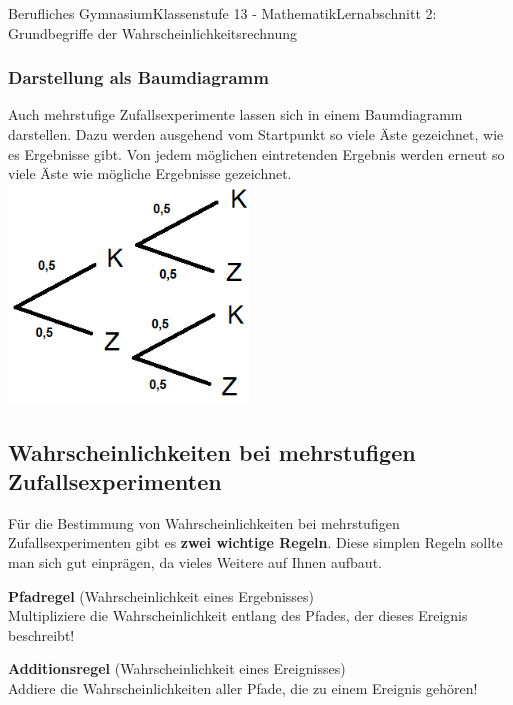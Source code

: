 \documentclass[11pt,twocolumn,oneside,openany,headings=optiontotoc,11pt,numbers=noenddot]{article}
\begin{document}
\begin{worksheet}{Berufliches Gymnasium}{Klassenstufe 13 - Mathematik}{Lernabschnitt 2: Grundbegriffe der Wahrscheinlichkeitsrechnung}
		\subsubsection{Darstellung als Baumdiagramm}
		Auch mehrstufige Zufallsexperimente lassen sich in einem Baumdiagramm darstellen. Dazu werden ausgehend vom Startpunkt so viele Äste gezeichnet, wie es Ergebnisse gibt. Von jedem möglichen eintretenden Ergebnis werden erneut so viele Äste wie mögliche Ergebnisse gezeichnet.\\
		\includegraphics[width=0.48\textwidth]{../99_Bilder/04_WKR/zsBaum.png}\\
		\subsection{Wahrscheinlichkeiten  bei mehrstufigen Zufallsexperimenten}
		Für die Bestimmung von Wahrscheinlichkeiten bei mehrstufigen Zufallsexperimenten gibt es \textbf{zwei wichtige Regeln}. Diese simplen Regeln sollte man sich gut einprägen, da vieles Weitere auf Ihnen aufbaut.
		\begin{framed}
			\noindent
			\textbf{Pfadregel} (Wahrscheinlichkeit eines Ergebnisses)\\
			Multipliziere die \grqq{}Wahrscheinlichkeit entlang des Pfades, der dieses Ereignis beschreibt!\grqq{}\\
			\par\noindent
			\textbf{Additionsregel} (Wahrscheinlichkeit eines Ereignisses)\\
			Addiere die Wahrscheinlichkeiten aller Pfade, die zu einem Ereignis gehören!
		\end{framed}
	\end{worksheet}
\end{document}
